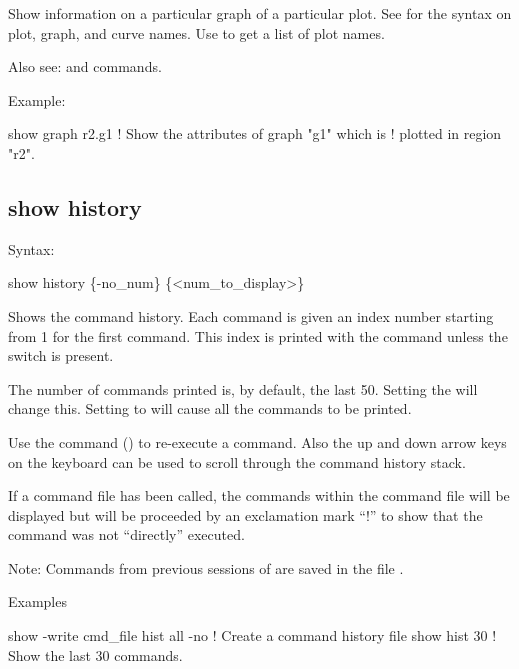 {{{{{{{{Show information on a particular graph of a particular plot. See  for the
syntax on plot, graph, and curve names.  Use  to get a list of plot names.

Also see:  and  commands.

Example:
\begin{example}
  show graph r2.g1         ! Show the attributes of graph "g1" which is 
                           !   plotted in region "r2".
\end{example}


\subsection{show history}
\label{s:show.history}

Syntax:
\begin{example}
  show history \{-no_num\} \{<num_to_display>\}
\end{example}

Shows the command history. Each command is given an index number starting from 1 for
the first command. This index is printed with the command unless the  switch
is present.

The number of commands printed is, by default, the last 50. Setting the  will
change this. Setting  to   will cause all the commands to be printed.

Use the command  () to re-execute a command. Also the up and down
arrow keys on the keyboard can be used to scroll through the command history stack.

If a command file has been called, the commands within the command file will be displayed but will
be proceeded by an exclamation mark ``!'' to show that the command was not ``directly'' executed.

Note: Commands from previous sessions of \tao are saved in the file .

Examples
\begin{example}
  show -write cmd_file hist all -no   ! Create a command history file
  show hist 30                        ! Show the last 30 commands.
\end{example}


}}}}}}}}
